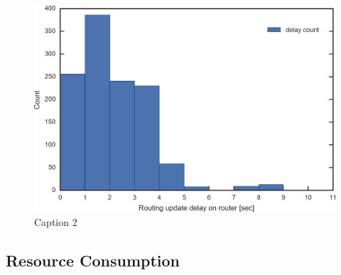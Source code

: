 \begin{figure}[t]
  \includegraphics[width=0.9\columnwidth,left]{Figs/ecmp_delay_histgram_ieice}
  \caption{Caption 2}
  \label{fig:ecmp_delay_histgram_ieice}
\end{figure}


\subsection{Resource Consumption}



